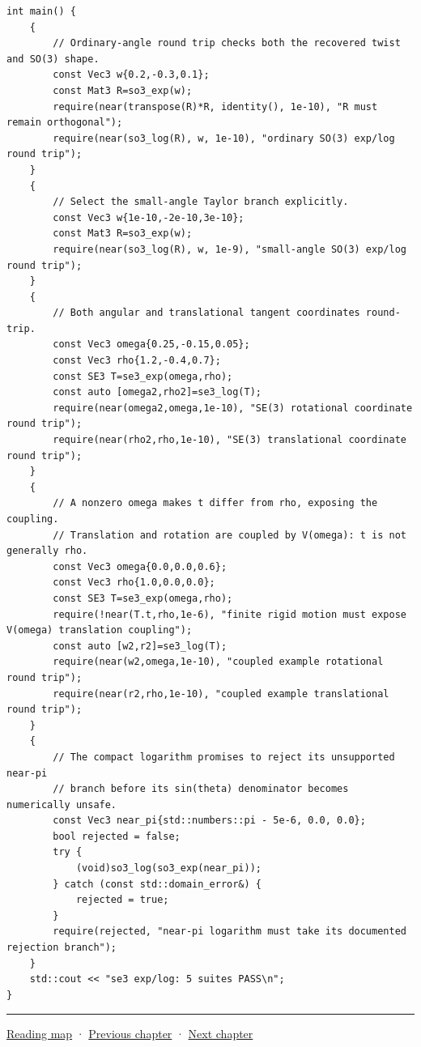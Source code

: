 \begin{verbatim}
int main() {
    {
        // Ordinary-angle round trip checks both the recovered twist and SO(3) shape.
        const Vec3 w{0.2,-0.3,0.1};
        const Mat3 R=so3_exp(w);
        require(near(transpose(R)*R, identity(), 1e-10), "R must remain orthogonal");
        require(near(so3_log(R), w, 1e-10), "ordinary SO(3) exp/log round trip");
    }
    {
        // Select the small-angle Taylor branch explicitly.
        const Vec3 w{1e-10,-2e-10,3e-10};
        const Mat3 R=so3_exp(w);
        require(near(so3_log(R), w, 1e-9), "small-angle SO(3) exp/log round trip");
    }
    {
        // Both angular and translational tangent coordinates round-trip.
        const Vec3 omega{0.25,-0.15,0.05};
        const Vec3 rho{1.2,-0.4,0.7};
        const SE3 T=se3_exp(omega,rho);
        const auto [omega2,rho2]=se3_log(T);
        require(near(omega2,omega,1e-10), "SE(3) rotational coordinate round trip");
        require(near(rho2,rho,1e-10), "SE(3) translational coordinate round trip");
    }
    {
        // A nonzero omega makes t differ from rho, exposing the coupling.
        // Translation and rotation are coupled by V(omega): t is not generally rho.
        const Vec3 omega{0.0,0.0,0.6};
        const Vec3 rho{1.0,0.0,0.0};
        const SE3 T=se3_exp(omega,rho);
        require(!near(T.t,rho,1e-6), "finite rigid motion must expose V(omega) translation coupling");
        const auto [w2,r2]=se3_log(T);
        require(near(w2,omega,1e-10), "coupled example rotational round trip");
        require(near(r2,rho,1e-10), "coupled example translational round trip");
    }
    {
        // The compact logarithm promises to reject its unsupported near-pi
        // branch before its sin(theta) denominator becomes numerically unsafe.
        const Vec3 near_pi{std::numbers::pi - 5e-6, 0.0, 0.0};
        bool rejected = false;
        try {
            (void)so3_log(so3_exp(near_pi));
        } catch (const std::domain_error&) {
            rejected = true;
        }
        require(rejected, "near-pi logarithm must take its documented rejection branch");
    }
    std::cout << "se3 exp/log: 5 suites PASS\n";
}
\end{verbatim}

\begin{center}\rule{0.5\linewidth}{0.5pt}\end{center}

\href{Chapter\%20Edition/01\%20-\%20Computing\%20Foundations/00\%20-\%20Reading\%20Map}{Reading map} · \hyperref[02-foundations-ii-ch026]{Previous chapter} · \hyperref[02-foundations-ii-ch028]{Next chapter}
